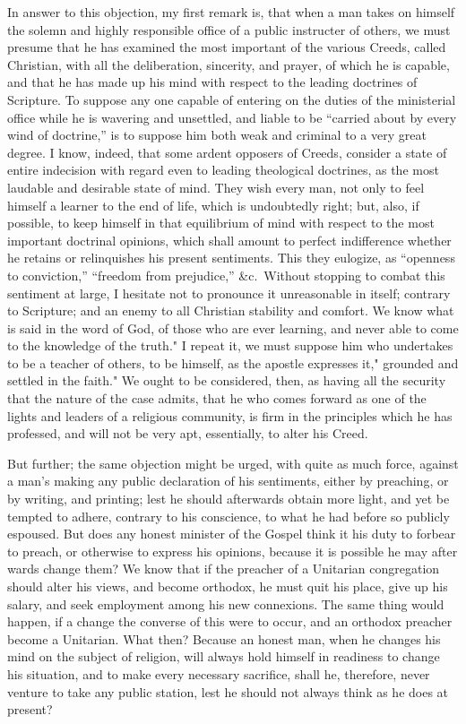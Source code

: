 \documentclass[
]{book}
\begin{document}
In answer to this objection, my first remark is, that when a man takes on himself the solemn and highly responsible office of a public instructer of others, we must presume that he has examined the most important of the various Creeds, called Christian, with all the deliberation, sincerity, and prayer, of which he is capable, and that he has made up his mind with respect to the leading doctrines of Scripture. To suppose any one capable of entering on the duties of the ministerial office while he is wavering and unsettled, and liable to be ``carried about by every wind of doctrine,'' is to suppose him both weak and criminal to a very great degree. I know, indeed, that some ardent opposers of Creeds, consider a state of entire indecision with regard even to leading theological doctrines, as the most laudable and desirable state of mind. They wish every man, not only to feel himself a learner to the end of life, which is undoubtedly right; but, also, if possible, to keep himself in that equilibrium of mind with respect to the most important doctrinal opinions, which shall amount to perfect indifference whether he retains or relinquishes his present sentiments. This they eulogize, as ``openness to conviction,'' ``freedom from prejudice,'' \&c.~Without stopping to combat this sentiment at large, I hesitate not to pronounce it unreasonable in itself; contrary to Scripture; and an enemy to all Christian stability and comfort. We know what is said in the word of God, of those who are ever learning, and never able to come to the knowledge of the truth." I repeat it, we must suppose him who undertakes to be a teacher of others, to be himself, as the apostle expresses it," grounded and settled in the faith." We ought to be considered, then, as having all the security that the nature of the case admits, that he who comes forward as one of the lights and leaders of a religious community, is firm in the principles which he has professed, and will not be very apt, essentially, to alter his Creed.

But further; the same objection might be urged, with quite as much force, against a man's making any public declaration of his sentiments, either by preaching, or by writing, and printing; lest he should afterwards obtain more light, and yet be tempted to adhere, contrary to his conscience, to what he had before so publicly espoused. But does any honest minister of the Gospel think it his duty to forbear to preach, or otherwise to express his opinions, because it is possible he may after wards change them? We know that if the preacher of a Unitarian congregation should alter his views, and become orthodox, he must quit his place, give up his salary, and seek employment among his new connexions. The same thing would happen, if a change the converse of this were to occur, and an orthodox preacher become a Unitarian. What then? Because an honest man, when he changes his mind on the subject of religion, will always hold himself in readiness to change his situation, and to make every necessary sacrifice, shall he, therefore, never venture to take any public station, lest he should not always think as he does at present?
\end{document}
